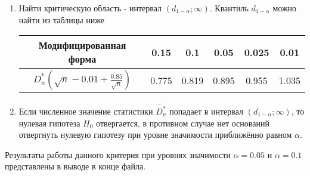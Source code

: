 \begin{enumerate}
\begin{enumerate}
	\end{enumerate}
	
	\item Найти критическую область - интервал $(d_{1-\alpha}; \infty)$. Квантиль $d_{1 - \alpha}$ можно найти из таблицы ниже
	
	\begin{center}
		\begin{tabular}{|c|c|c|c|c|c|}
			\hline
			Модифицированная форма & 0.15 & 0.1 & 0.05 & 0.025 & 0.01 \\
			\hline
			$D^*_n (\sqrt{n} - 0.01 + \frac{0.85}{\sqrt{n}})$ & 0.775 & 0.819 & 0.895 & 0.955 & 1.035 \\
			\hline
		\end{tabular}
	\end{center}

	\item Если численное значение статистики $\tilde{D^*_n}$ попадает в интервал $(d_{1 - \alpha}; \infty)$, то нулевая гипотеза $H_0$ отвергается, в противном случае нет оснований отвергнуть нулевую гипотезу при уровне значимости приближённо равном $\alpha$.
	
\end{enumerate}

Результаты работы данного критерия при уровнях значимости $\alpha = 0.05$ и $\alpha = 0.1$ представлены в выводе в конце файла.
